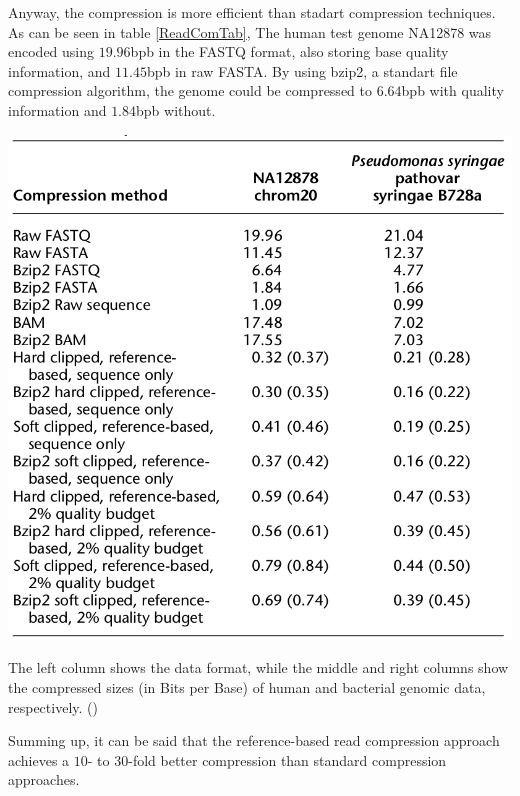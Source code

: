\documentclass[acmtocl,acmnow]{article}
\begin{document}
Anyway, the compression is more efficient than stadart compression techniques. As can be seen in table \ref{ReadComTab},
The human test genome NA12878 was encoded using $19.96$bpb in the FASTQ format, also storing base quality information,
and $11.45$bpb in raw FASTA. By using bzip2, a standart file compression algorithm, the genome could be compressed to
$6.64$bpb with quality information and $1.84$bpb without.
\begin{table}
  \begin{center}
    \includegraphics[width=\textwidth]{img/ReadCompTab.png}
    \label{ReadCompTab}
    \caption{The left column shows the data format, while the middle and right columns show the compressed sizes (in Bits 
    per Base) of human and bacterial genomic data, respectively. (\cite{FriLeiCho})}
  \end{center}
\end{table}
Summing up, it can be said that the reference-based read compression approach achieves a $10$- to $30$-fold better
compression than standard compression  approaches.
\end{document}
